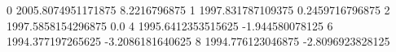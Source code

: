 0 2005.8074951171875 8.2216796875
1 1997.831787109375 0.2459716796875
2 1997.5858154296875 0.0
4 1995.6412353515625 -1.944580078125
6 1994.377197265625 -3.2086181640625
8 1994.776123046875 -2.8096923828125
